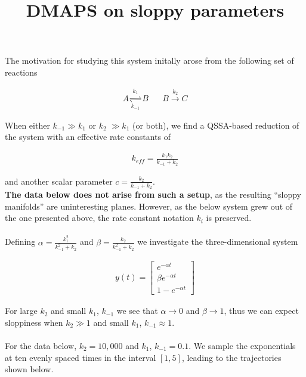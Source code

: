 \documentclass[12pt]{article}
\begin{document}
\title{DMAPS on sloppy parameters}
\maketitle

The motivation for studying this system initally arose from the following set of reactions

\begin{align*}
  A \underset{k_{-1}}{\stackrel{k_1}{\rightleftharpoons}} B \; \; \; \; \; \; B \stackrel{k_2}{\rightarrow} C
\end{align*}

When either $k_{-1} \gg k_1$ or $k_2 \; \gg k_1$ (or both), we find a QSSA-based reduction of the system with an effective rate constants of

\begin{align*}
  k_{eff} = \frac{k_1 k_2}{k_{-1} + k_2}
\end{align*}

and another scalar parameter $c = \frac{k_2}{k_{-1} + k_2}$. \\

\textbf{The data below does not arise from such a setup}, as the resulting ``sloppy manifolds'' are uninteresting planes. However, as the below system grew out of the one presented above, the rate constant notation $k_i$ is preserved. \\

\hrulefill \\

Defining $\alpha = \frac{k_1^2}{k_{-1}^2 + k_2}$ and $\beta = \frac{k_2}{k_{-1}^2 + k_2}$ we investigate the three-dimensional system

\begin{align*}
  y(t) = \begin{bmatrix} e^{-\alpha t} \\ \beta e^{-\alpha t} \\ 1 - e^{-\alpha t} \end{bmatrix}
\end{align*}

For large $k_2$ and small $k_1$, $k_{-1}$ we see that $\alpha \rightarrow 0$ and $\beta \rightarrow 1$, thus we can expect sloppiness when $k_2 \gg 1$ and small $k_1$, $k_{-1} \approx 1$. \\ \\

For the data below, $k_2 = 10,000$ and $k_1$, $k_{-1} = 0.1$. We sample the exponentials at ten evenly spaced times in the interval $[1, 5]$, leading to the trajectories shown below.
\end{document}
